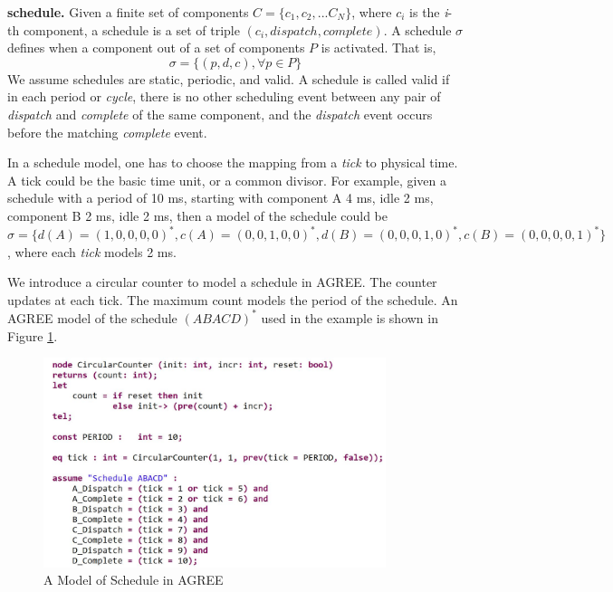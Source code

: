 {\bf schedule.}
Given a finite set of components $C = \{c_1, c_2,... C_N\}$, where $c_i$ is the \emph{i}-th component, a schedule is a set of triple $(c_i, dispatch, complete)$.
A schedule $\sigma$ defines when a component out of a set of components $P$ is activated. That is,  
$$\sigma = \{(p, d, c), \forall p \in P  \}$$ 
We assume schedules are static, periodic, and valid. A schedule is called valid if in each period or \emph{cycle}, there is no other scheduling event between any pair of \emph{dispatch} and \emph{complete} of the same component, and the \emph{dispatch} event occurs before the matching \emph{complete} event. 

In a schedule model, one has to choose the mapping from a \emph{tick} to physical time. A tick could be the basic time unit, or a common divisor. For example, given a schedule with a period of 10 ms, starting with component A 4 ms, idle 2 ms, component B 2 ms, idle 2 ms, then a model of the schedule could be $\sigma = \{d(A)=(1,0,0,0,0)^*, c(A) = (0,0,1,0,0)^*, d(B) = (0,0,0,1,0)^*, c(B) = (0,0,0,0,1)^*\}$, where each \emph{tick} models 2 ms. 

We introduce a circular counter to model a schedule in AGREE. The counter updates at each tick. The maximum count models the period of the schedule. An AGREE model of the schedule $(ABACD)^*$ used in the example is shown in Figure \ref{schedule}.
\begin{figure}[ht!]
\centering
\includegraphics[width=100mm]{schedule.jpg}
\caption{A Model of Schedule in AGREE\label{schedule}}
\end{figure}


%				
%

